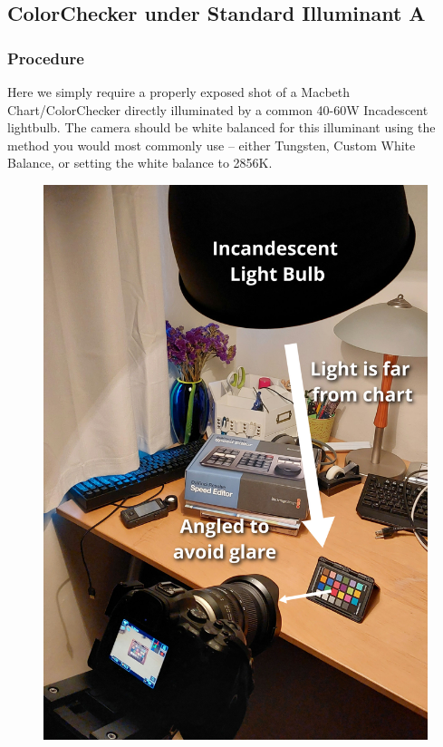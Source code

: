 \documentclass[twoside]{article}
\begin{document}
\subsection{ColorChecker under Standard Illuminant A}\label{chartA}

\subsubsection{Procedure}
Here we simply require a properly exposed shot of a Macbeth Chart/ColorChecker directly illuminated by a common 40-60W Incadescent lightbulb. The camera should be white balanced for this illuminant using the method you would most commonly use -- either Tungsten, Custom White Balance, or setting the white balance to 2856K.

\begin{figure}[ht]
    \centering
    \includegraphics[scale=0.08]{images/tungsten_color_chart_setup0000.jpg}
\end{figure}
\end{document}
